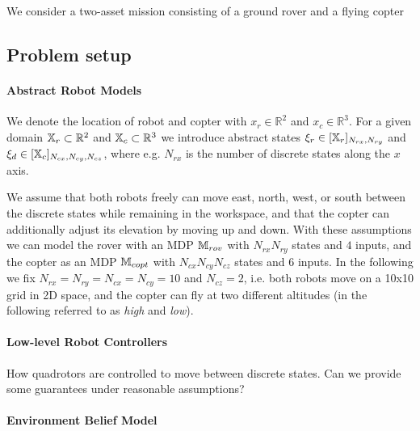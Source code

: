\documentclass[conference]{IEEEtran}
\newcommand{\red}[1]{{\color{red} #1 }}
\begin{document}
We consider a two-asset mission consisting of a ground rover and a flying copter 

\subsection{Problem setup}

\paragraph{Abstract Robot Models}

We denote the location of robot and copter with $x_r \in \mathbb{R}^2$ and $x_c \in \mathbb{R}^3$. For a given domain $\mathbb{X}_r \subset \mathbb{R}^2$ and $\mathbb{X}_c \subset \mathbb{R}^3$ we introduce abstract states $\xi_r \in [\mathbb{X}_r]_{N_{rx}, N_{ry}}$ and $\xi_d \in [\mathbb{X}_c]_{N_{cx}, N_{cy}, N_{cz}}$, where e.g. $N_{rx}$ is the number of discrete states along the $x$ axis. 

We assume that both robots freely can move east, north, west, or south between the discrete states while remaining in the workspace, and that the copter can additionally adjust its elevation by moving up and down. With these assumptions we can model the rover with an MDP $\mathbb{M}_{rov}$ with $N_{rx} N_{ry}$ states and $4$ inputs, and the copter as an MDP $\mathbb{M}_{copt}$ with $N_{cx} N_{cy} N_{cz}$ states and $6$ inputs. In the following we fix $N_{rx} = N_{ry} = N_{cx} = N_{cy} = 10$ and $N_{cz} = 2$, i.e. both robots move on a 10x10 grid in 2D space, and the copter can fly at two different altitudes (in the following referred to as \emph{high} and \emph{low}).

\paragraph{Low-level Robot Controllers}

How quadrotors are controlled to move between discrete states. \red{Can we provide some guarantees under reasonable assumptions?}

\paragraph{Environment Belief Model}
\end{document}

